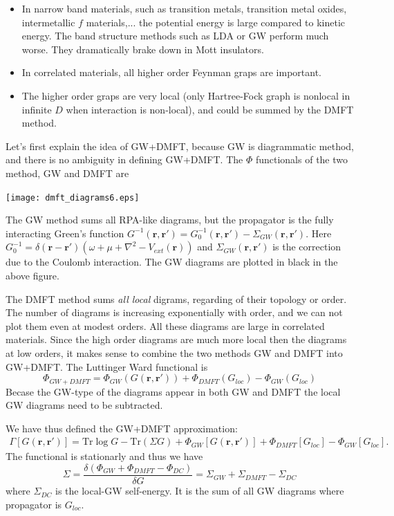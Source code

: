 \documentclass[usenames,letter,landscape,semhelv]{seminar}
\newcommand{\vr}{{\mathbf{r}}}
\renewcommand{\Tr}{\mathrm{Tr}}
\begin{document}
\begin{slide}
\begin{itemize}
\item In narrow band materials, such as transition metals, transition
  metal oxides, intermetallic $f$ materials,... the potential energy
  is large compared to kinetic energy.
  The band structure methods such as LDA or GW perform much
  worse. They dramatically brake down in Mott insulators.

\item In correlated materials, all higher order Feynman graps are
  important.
  
\item The higher order graps are very local (only Hartree-Fock graph
  is nonlocal in infinite $D$ when interaction is non-local), and
  could be summed by the DMFT method.
  
\end{itemize}

Let's first explain the idea of GW+DMFT, because GW is diagrammatic
method, and there is no ambiguity in defining GW+DMFT. The $\Phi$
functionals of the two method, GW and DMFT are

\texttt{[image: dmft\_diagrams6.eps]}


The GW method sums all RPA-like diagrams, but the propagator is the
fully interacting Green's function $G^{-1}(\vr,\vr') =
G_0^{-1}(\vr,\vr')-\Sigma_{GW}(\vr,\vr')$.  Here $G_0^{-1} =
\delta(\vr-\vr')(\omega+\mu+\nabla^2-V_{ext}(\vr))$ and
$\Sigma_{GW}(\vr,\vr')$ is the correction due to the Coulomb
interaction.  The GW diagrams are plotted in black in the above
figure.

The DMFT method sums \textit{all local} digrams, regarding of their
topology or order. The number of diagrams is increasing exponentially
with order, and we can not plot them even at modest orders. All these
diagrams are large in correlated materials. Since the high order
diagrams are much more local then the diagrams at low orders, it makes
sense to combine the two methods GW and DMFT into GW+DMFT. The
Luttinger Ward functional is
\begin{equation}
\Phi_{GW+DMFT} = \Phi_{GW}( G(\vr,\vr') )  + \Phi_{DMFT}(G_{loc}) - \Phi_{GW}(G_{loc})
\end{equation}
Becase the GW-type of the diagrams appear in both GW and DMFT the
local GW diagrams need to be subtracted.


We have thus defined the GW+DMFT approximation:
\begin{eqnarray}
\Gamma[G(\vr,\vr')] = \Tr\log G - \Tr(\Sigma G) +
\Phi_{GW}[G(\vr,\vr')] + \Phi_{DMFT}[G_{loc}] - \Phi_{GW}[G_{loc}].
\end{eqnarray}
The functional is stationarly and thus we have
\begin{equation}
\Sigma = \frac{\delta (\Phi_{GW} + \Phi_{DMFT}-\Phi_{DC})}{\delta G}= \Sigma_{GW} + \Sigma_{DMFT} - \Sigma_{DC}
\end{equation}
where $\Sigma_{DC}$ is the local-GW self-energy. It is the sum of all
GW diagrams where propagator is $G_{loc}$.





\end{slide}
\end{document}
